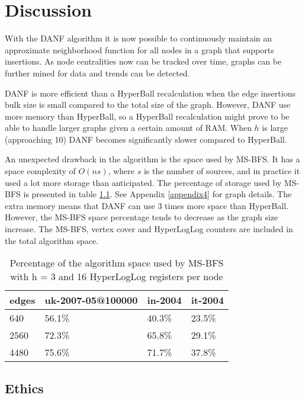 \chapter{Discussion}
With the DANF algorithm it is now possible to continuously maintain an approximate neighborhood function for all nodes in a graph that supports insertions. As node centralities now can be tracked over time, graphs can be further mined for data and trends can be detected. 

DANF is more efficient than a HyperBall recalculation when the edge insertions bulk size is small compared to the total size of the graph. However, DANF use more memory than HyperBall, so a HyperBall recalculation might prove to be able to handle larger graphs given a certain amount of RAM. When $h$ is large (approaching 10) DANF becomes significantly slower compared to HyperBall.

An unexpected drawback in the algorithm is the space used by MS-BFS. It has a space complexity of $O(ns)$, where $s$ is the number of sources, and in practice it used a lot more storage than anticipated. The percentage of storage used by MS-BFS is presented in table \ref{table:ms-bfs_space}. See Appendix \ref{appendix4} for graph details. The extra memory means that DANF can use 3 times more space than HyperBall. However, the MS-BFS space percentage tends to decrease as the graph size increase. The MS-BFS, vertex cover and HyperLogLog counters are included in the total algorithm space.

\begin{table}[h]
    \center
    \begin{tabular}{ | l | l | l | l |}
        \hline
        edges & uk-2007-05@100000 & in-2004 & it-2004 \\ \hline
        640  & 56.1\% & 40.3\% & 23.5\% \\ \hline
        2560 & 72.3\% & 65.8\% & 29.1\% \\ \hline 
        4480 & 75.6\% & 71.7\% & 37.8\% \\
        \hline
    \end{tabular}
    \captionsetup{justification=centering}
    \caption{Percentage of the algorithm space used by MS-BFS with h = 3 and 16 HyperLogLog registers per node}
    \label{table:ms-bfs_space}
\end{table}

\section{Ethics}

